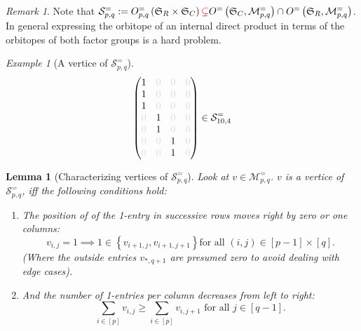 \documentclass[a4paper]{amsart}
\theoremstyle{lemma}
\newtheorem{lemma}[theorem]{Lemma}
\theoremstyle{definition}
\theoremstyle{remark}
\newtheorem{remark}[theorem]{Remark}
\theoremstyle{example}
\newtheorem{example}[theorem]{Example}
\newcommand{\lr}[1]{\ensuremath{\left( #1 \right)}}
\newcommand{\lrE}[1]{\ensuremath{\left[ #1 \right]}}
\newcommand{\lrM}[1]{\ensuremath{\left\{ #1 \right\}}}
\newcommand{\M}{\ensuremath{\mathcal{M}}}
\newcommand{\calS}{\ensuremath{\mathcal{S}}}
\newcommand{\Sym}{\ensuremath{\mathfrak{S}}}
\newcommand{\SymRC}{\ensuremath{\Sym_R \times \Sym_C}}
\begin{document}
\begin{remark}
  Note that \(\calS^=_{p, q} := O^=_{p, q} \lr{\SymRC} {\color{red}\subsetneq}
  O^=\lr{\Sym_C,\M^=_{p, q}} \cap O^=\lr{\Sym_R, \M^=_{p, q}}\).  In
  general expressing the orbitope of an internal direct product in
  terms of the orbitopes of both factor groups is a hard problem.
\end{remark}

\begin{example}[A vertice of \(\calS^=_{p, q}\)]
\label{zumBild}
\[\lr{\begin{matrix}
      1 & {\color{lightgray} 0} & {\color{lightgray} 0} & {\color{lightgray} 0} \\
      1 & {\color{lightgray} 0} & {\color{lightgray} 0} & {\color{lightgray} 0} \\
      1 & {\color{lightgray} 0} & {\color{lightgray} 0} & {\color{lightgray} 0} \\
      {\color{lightgray} 0} & 1 & {\color{lightgray} 0} & {\color{lightgray} 0} \\      
      {\color{lightgray} 0} & 1 & {\color{lightgray} 0} & {\color{lightgray} 0} \\
      {\color{lightgray} 0} & {\color{lightgray} 0} & 1 & {\color{lightgray} 0} \\      
      {\color{lightgray} 0} & {\color{lightgray} 0} & 1 & {\color{lightgray} 0} \\      
    \end{matrix}
  } \in \calS^=_{10, 4}
\]
\end{example}

\begin{lemma}[Characterizing vertices of \(\calS^=_{p, q}\)]
  \label{charVert}
  Look at \(v \in \M^=_{p, q}\).  \(v\) is a vertice of \(\calS^=_{p,
    q}\), iff the following conditions hold:
  \begin{enumerate}
  \item \label{cond1} The position of of the 1-entry in
    successive rows moves right by zero or one columns:
    \begin{equation*}
      v_{i,j} = 1 \implies 1 \in \lrM{v_{i+1,j}, v_{i+1,j+1}} \text{
        for all }\lr{i,j} \in \lrE{p-1} \times \lrE{q} \text{.}
    \end{equation*}
    (Where the outside entries \(v_{*,q+1}\) are presumed zero to
    avoid dealing with edge cases).
  \item \label{cond2} And the number of 1-entries per column decreases
    from left to right:
    \begin{equation*} \sum_{i\in \lrE{p}} {v_{i, j}} \geq \sum_{i \in \lrE{p}}
      {v_{i, j+1}} \text{ for all \(j \in \lrE{q-1}\).}
    \end{equation*}
  \end{enumerate}
\end{lemma}
\end{document}
